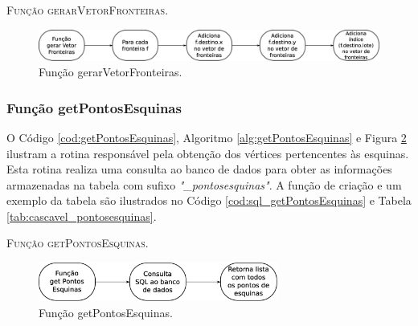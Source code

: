 

\begin{algorithm}[H]
   \SetAlgoLined   
   
   \caption{\textsc{Função gerarVetorFronteiras.}}
   \label{alg:gerarVetorFronteiras}
\end{algorithm}

\begin{figure}[H]
  \centering
  \includegraphics[width=1\textwidth]{Figuras/Simula/Fluxos/gerarVetorFronteiras.eps}
  \caption{Função gerarVetorFronteiras.}
  \label{fig:gerarVetorFronteiras}
\end{figure} 

\newpage

\subsubsection{Função getPontosEsquinas}

O Código \ref{cod:getPontosEsquinas}, Algoritmo \ref{alg:getPontosEsquinas} e Figura \ref{fig:getPontosEsquinas} ilustram a rotina responsável pela obtenção dos vértices pertencentes às esquinas. Esta rotina realiza uma consulta ao banco de dados para obter as informações armazenadas na tabela com sufixo \textit{"\_pontosesquinas"}. A função de criação e um exemplo da tabela são ilustrados no Código \ref{cod:sql_getPontosEsquinas} e Tabela \ref{tab:cascavel_pontosesquinas}.  



\begin{algorithm}[H]
   \SetAlgoLined   
   
   \caption{\textsc{Função getPontosEsquinas.}}
   \label{alg:getPontosEsquinas}
\end{algorithm}

\begin{figure}[H]
  \centering
  \includegraphics[width=0.7\textwidth]{Figuras/Simula/Fluxos/getPontosEsquinas.eps}
  \caption{Função getPontosEsquinas.}
  \label{fig:getPontosEsquinas}
\end{figure} 

